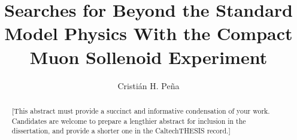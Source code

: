 \documentclass[12pt]{caltech_thesis}
\begin{document}
\title{Searches for Beyond the Standard Model Physics With the Compact
Muon Sollenoid Experiment}
\author{Cristi\'an H. Pe\~na}

\address{Pasadena, California}                     %



\maketitle[logo]

\begin{acknowledgements} 	 
\end{acknowledgements}

\begin{abstract}
   [This abstract must provide a succinct and informative condensation of your work. Candidates are welcome to prepare a lengthier abstract for inclusion in the dissertation, and provide a shorter one in the CaltechTHESIS record.]
\end{abstract}

\begin{publishedcontent}%
\nocite{Cahn:etal:2015}
\end{publishedcontent}
\end{document}

